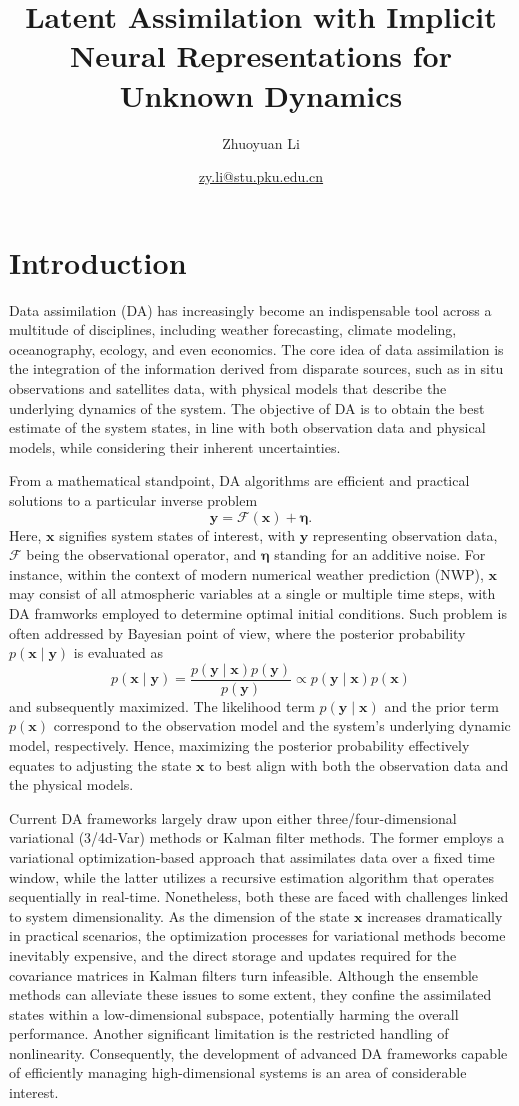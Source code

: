 \documentclass{article}
\title{Latent Assimilation with Implicit Neural Representations for Unknown Dynamics}
\author{Zhuoyuan Li}
\date{\href{mailto:zy.li@stu.pku.edu.cn}{zy.li@stu.pku.edu.cn}}
\newcommand{\mF}{\mathcal{F}}
\begin{document}
\maketitle
\section{Introduction}
Data assimilation (DA) has increasingly become an indispensable tool across a multitude of disciplines, including weather forecasting, climate modeling, oceanography, ecology, and even economics. The core idea of data assimilation is the integration of the information derived from disparate sources, such as in situ observations and satellites data, with physical models that describe the underlying dynamics of the system. The objective of DA is to obtain the best estimate of the system states, in line with both observation data and physical models, while considering their inherent uncertainties.

From a mathematical standpoint, DA algorithms are efficient and practical solutions to a particular inverse problem
\[\bm y=\mF(\bm x)+\bm\eta.\]
Here, $\bm x$ signifies system states of interest, with $\bm y$ representing observation data, $\mF$ being the observational operator, and $\bm\eta$ standing for an additive noise. For instance, within the context of modern numerical weather prediction (NWP), $\bm x$ may consist of all atmospheric variables at a single or multiple time steps, with DA framworks employed to determine optimal initial conditions. Such problem is often addressed by Bayesian point of view, where the posterior probability $p(\bm x\mid\bm y)$ is evaluated as
\[p(\bm x\mid\bm y)=\frac{p(\bm y\mid\bm x)p(\bm y)}{p(\bm y)}\propto p(\bm y\mid\bm x)p(\bm x)\]
and subsequently maximized. The likelihood term $p(\bm y\mid\bm x)$ and the prior term $p(\bm x)$ correspond to the observation model and the system's underlying dynamic model, respectively. Hence, maximizing the posterior probability effectively equates to adjusting the state $\bm x$ to best align with both the observation data and the physical models.

Current DA frameworks largely draw upon either three/four-dimensional variational (3/4d-Var) methods or Kalman filter methods. The former employs a variational optimization-based approach that assimilates data over a fixed time window, while the latter utilizes a recursive estimation algorithm that operates sequentially in real-time. Nonetheless, both these are faced with challenges linked to system dimensionality. As the dimension of the state $\bm x$ increases dramatically in practical scenarios, the optimization processes for variational methods become inevitably expensive, and the direct storage and updates required for the covariance matrices in Kalman filters turn infeasible. Although the ensemble methods can alleviate these issues to some extent, they confine the assimilated states within a low-dimensional subspace, potentially harming the overall performance. Another significant limitation is the restricted handling of nonlinearity. Consequently, the development of advanced DA frameworks capable of efficiently managing high-dimensional systems is an area of considerable interest.
\end{document}
